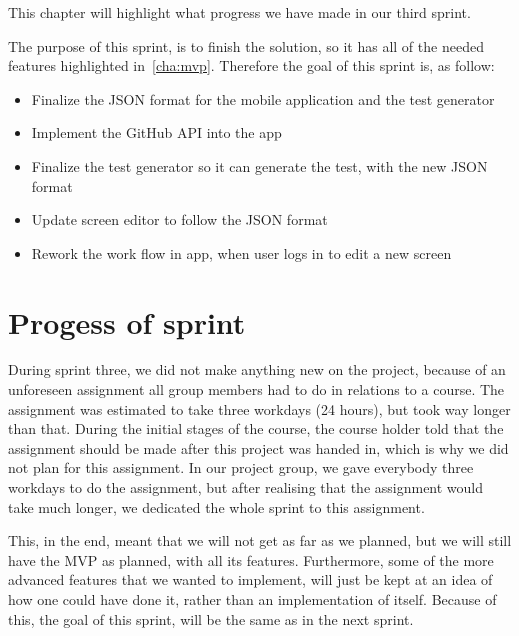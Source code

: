 This chapter will highlight what progress we have made in our third sprint.

The purpose of this sprint, is to finish the solution, so it has all of the needed features highlighted in~\autoref{cha:mvp}.
Therefore the goal of this sprint is, as follow:

\begin{itemize}
    \item Finalize the JSON format for the mobile application and the test generator
    \item Implement the GitHub API into the app
    \item Finalize the test generator so it can generate the test, with the new JSON format
    \item Update screen editor to follow the JSON format
    \item Rework the work flow in app, when user logs in to edit a new screen
\end{itemize}

\section{Progess of sprint}
During sprint three, we did not make anything new on the project, because of an unforeseen assignment all group members had to do in relations to a course.
The assignment was estimated to take three workdays (24 hours), but took way longer than that.
During the initial stages of the course, the course holder told that the assignment should be made after this project was handed in, which is why we did not plan for this assignment.
In our project group, we gave everybody three workdays to do the assignment, but after realising that the assignment would take much longer, we dedicated the whole sprint to this assignment.

This, in the end, meant that we will not get as far as we planned, but we will still have the MVP as planned, with all its features.
Furthermore, some of the more advanced features that we wanted to implement, will just be kept at an idea of how one could have done it, rather than an implementation of itself.
Because of this, the goal of this sprint, will be the same as in the next sprint.